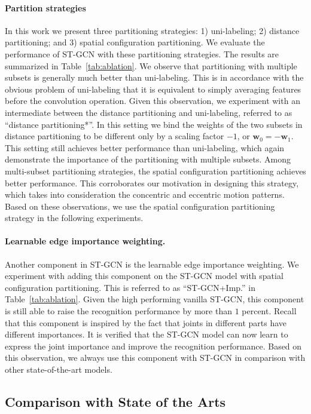\documentclass[letterpaper]{article} %
\begin{document}
\paragraph{Partition strategies}
In this work we present three partitioning strategies: 1) uni-labeling; 2) distance partitioning; and 3) spatial configuration partitioning.
We evaluate the performance of ST-GCN with these partitioning strategies.
The results are summarized in Table~\ref{tab:ablation}.
We observe that partitioning with multiple subsets is generally much better than uni-labeling.
This is in accordance with the obvious problem of uni-labeling that it is equivalent to simply averaging features before the convolution operation.
Given this observation, we experiment with an intermediate between the distance partitioning and uni-labeling, referred to as ``distance partitioning*''.
In this setting we bind the weights of the two subsets in distance partitioning to be different only by a scaling factor $-1$, or $ \mathbf{w}_0 = -\mathbf{w}_1 $.
This setting still achieves better performance than uni-labeling, which again demonstrate the importance of the partitioning with multiple subsets.
Among multi-subset partitioning strategies, the spatial configuration partitioning achieves better performance.
This corroborates our motivation in designing this strategy, which takes into consideration the concentric and eccentric motion patterns.
Based on these observations, we use the spatial configuration partitioning strategy in the following experiments.


\paragraph{Learnable edge importance weighting.}
Another component in ST-GCN is the learnable edge importance weighting.
We experiment with adding this component on the ST-GCN model with spatial configuration partitioning.
This is referred to as ``ST-GCN+Imp.'' in Table~\ref{tab:ablation}.
Given the high performing vanilla ST-GCN, this component is still able to raise the recognition performance by more than $ 1 $ percent.
Recall that this component is inspired by the fact that joints in different parts have different importances.
It is verified that the ST-GCN model can now learn to express the joint importance and improve the recognition performance.
Based on this observation, we always use this component with ST-GCN in comparison with other state-of-the-art models.


\subsection{Comparison with State of the Arts}
\end{document}
